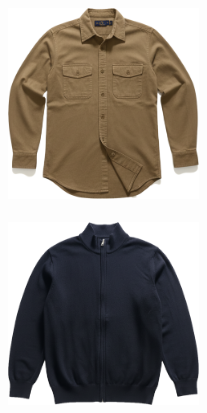 \documentclass[10pt]{article}
\begin{document}
\begin{minipage}[c][50.60mm][c]{50.60mm}
\end{minipage} \hspace*{6.00mm} \begin{minipage}[c][50.60mm][c]{50.60mm}\centering
\includegraphics[width=50.60mm,height=50.60mm,keepaspectratio]{assets/midlayer/military-green-armani-button-up.png}\
\end{minipage} \hspace*{6.00mm} \begin{minipage}[c][50.60mm][c]{50.60mm}\centering
\includegraphics[width=50.60mm,height=50.60mm,keepaspectratio]{assets/midlayer/blue-navy-full-zip.png}\
\end{minipage}\
\vspace*{6.00mm}\
\end{document}
